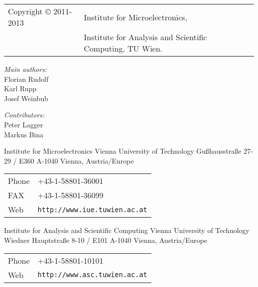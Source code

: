 
\clearpage

\begin{tabular}{ll}
Copyright {\copyright} 2011-2013 & Institute for Microelectronics, \\
                            & Institute for Analysis and Scientific Computing, TU Wien.
\end{tabular}

\vspace{2.5cm}

\textit{Main authors:}\\

Florian Rudolf \\
Karl Rupp\\
Josef Weinbub \\

\vspace{1cm}

\textit{Contributors:}\\

Peter Lagger \\
Markus Bina


\vspace{3.0cm}

Institute for Microelectronics\newline
Vienna University of Technology\newline
Gu\ss hausstra\ss e 27-29 / E360\newline
A-1040 Vienna, Austria/Europe\newline

\begin{tabular}{ll}
Phone  & +43-1-58801-36001\\
FAX    & +43-1-58801-36099\\
Web    & \texttt{http://www.iue.tuwien.ac.at}
\end{tabular}

\vspace{1.5cm}

Institute for Analysis and Scientific Computing\newline
Vienna University of Technology\newline
Wiedner Hauptstra\ss e 8-10 / E101\newline
A-1040 Vienna, Austria/Europe\newline

\begin{tabular}{ll}
Phone  & +43-1-58801-10101\\
Web    & \texttt{http://www.asc.tuwien.ac.at}
\end{tabular}




